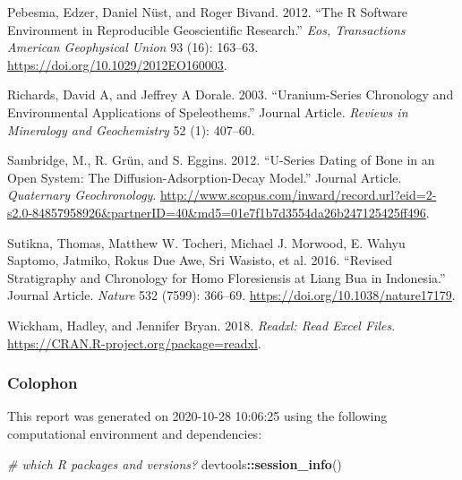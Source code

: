 \documentclass[]{elsarticle} %
\newenvironment{Shaded}{\begin{snugshade}}{\end{snugshade}}
\newcommand{\CommentTok}[1]{\textcolor[rgb]{0.56,0.35,0.01}{\textit{#1}}}
\newcommand{\KeywordTok}[1]{\textcolor[rgb]{0.13,0.29,0.53}{\textbf{#1}}}
\newcommand{\NormalTok}[1]{#1}
\newcommand{\OperatorTok}[1]{\textcolor[rgb]{0.81,0.36,0.00}{\textbf{#1}}}
\newlength{\cslhangindent}
\newenvironment{cslreferences}%
  {\setlength{\parindent}{0pt}%
  \everypar{\setlength{\hangindent}{\cslhangindent}}\ignorespaces}%
  {\par}
\begin{document}
\begin{cslreferences}
\leavevmode\hypertarget{ref-Pebesma_Nust_Bivand_2012}{}%
Pebesma, Edzer, Daniel Nüst, and Roger Bivand. 2012. ``The R Software Environment in Reproducible Geoscientific Research.'' \emph{Eos, Transactions American Geophysical Union} 93 (16): 163--63. \url{https://doi.org/10.1029/2012EO160003}.

\leavevmode\hypertarget{ref-RN4494}{}%
Richards, David A, and Jeffrey A Dorale. 2003. ``Uranium-Series Chronology and Environmental Applications of Speleothems.'' Journal Article. \emph{Reviews in Mineralogy and Geochemistry} 52 (1): 407--60.

\leavevmode\hypertarget{ref-Sambridge2012}{}%
Sambridge, M., R. Grün, and S. Eggins. 2012. ``U-Series Dating of Bone in an Open System: The Diffusion-Adsorption-Decay Model.'' Journal Article. \emph{Quaternary Geochronology}. \url{http://www.scopus.com/inward/record.url?eid=2-s2.0-84857958926\&partnerID=40\&md5=01e7f1b7d3554da26b247125425ff496}.

\leavevmode\hypertarget{ref-Sutikna2016}{}%
Sutikna, Thomas, Matthew W. Tocheri, Michael J. Morwood, E. Wahyu Saptomo, Jatmiko, Rokus Due Awe, Sri Wasisto, et al. 2016. ``Revised Stratigraphy and Chronology for Homo Floresiensis at Liang Bua in Indonesia.'' Journal Article. \emph{Nature} 532 (7599): 366--69. \url{https://doi.org/10.1038/nature17179}.

\leavevmode\hypertarget{ref-Wickham_readxl}{}%
Wickham, Hadley, and Jennifer Bryan. 2018. \emph{Readxl: Read Excel Files}. \url{https://CRAN.R-project.org/package=readxl}.
\end{cslreferences}

\newpage

\hypertarget{colophon}{%
\subsubsection{Colophon}\label{colophon}}

This report was generated on 2020-10-28 10:06:25 using the following computational environment and dependencies:

\begin{Shaded}
\begin{Highlighting}[]
\CommentTok{\# which R packages and versions?}
\NormalTok{devtools}\OperatorTok{::}\KeywordTok{session\_info}\NormalTok{()}
\end{Highlighting}
\end{Shaded}
\end{document}
